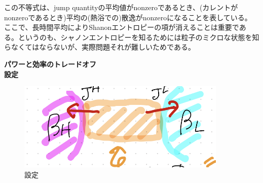 \documentclass[a4paper,11pt]{jsarticle}
\numberwithin{equation}{section}
\begin{document}
この不等式は、jump quantityの平均値がnonzeroであるとき、(カレントがnonzeroであるとき)平均の(熱浴での)散逸がnonzeroになることを表している。\\
ここで、長時間平均によりShanonエントロピーの項が消えることは重要である。というのも、シャノンエントロピーを知るためには粒子のミクロな状態を知らなくてはならないが、実際問題それが難しいためである。

\textbf{パワーと効率のトレードオフ}\\
\textbf{設定}\\
\begin{figure}[H]
    \begin{center}
    \includegraphics[width=100mm]{set.png}
    \end{center}
    \caption{設定}
    \label{fig:set}
\end{figure}
\end{document}

